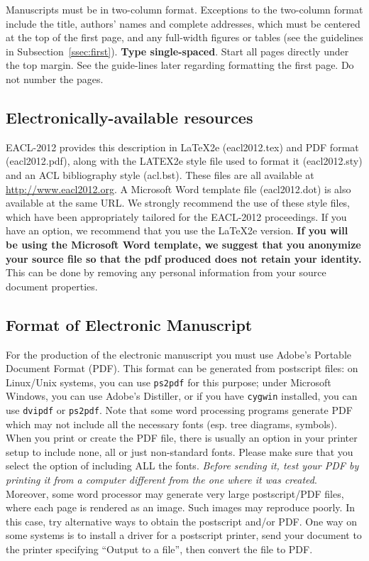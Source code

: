 \documentclass[11pt]{article}
\begin{document}
Manuscripts must be in two-column format. Exceptions to the two-column format include the title, 
authors' names and complete addresses, which must be centered at the top of the first page, 
and any full-width figures or tables (see the guidelines in Subsection~\ref{ssec:first}). {\bf Type single-spaced}. 
Start all pages directly under the top margin. See the guide-lines later regarding formatting the first page. Do not number the pages.

\subsection{Electronically-available resources}

EACL-2012 provides this description in \LaTeX2e (eacl2012.tex) and PDF format (eacl2012.pdf), along with the LATEX2e style file used to format it (eacl2012.sty) and an ACL bibliography style (acl.bst). These files are all available at \url{http://www.eacl2012.org}.  A Microsoft Word template file (eacl2012.dot) is also available at the same URL. We strongly recommend the use of these style files, which have been appropriately tailored for the EACL-2012 proceedings. If you have an option, we recommend that you use the \LaTeX2e version. \textbf{If you will be using the Microsoft Word template, we suggest that you anonymize your source file so that the pdf produced does not retain your identity.} This can be done by removing any personal information from your source
document properties.


\subsection{Format of Electronic Manuscript}
\label{sect:pdf}

For the production of the electronic manuscript you must use Adobe's
Portable Document Format (PDF). This format can be generated from
postscript files: on Linux/Unix systems, you can use {\tt ps2pdf} for this
purpose; under Microsoft Windows, you can use Adobe's Distiller, or
if you have {\tt cygwin} installed, you can use {\tt dvipdf} or
{\tt ps2pdf}.  Note
that some word processing programs generate PDF which may not include
all the necessary fonts (esp. tree diagrams, symbols). When you print
or create the PDF file, there is usually an option in your printer
setup to include none, all or just non-standard fonts.  Please make
sure that you select the option of including ALL the fonts.  {\em Before sending it, test your PDF by printing it from a computer different from the one where it was created}. Moreover,
some word processor may generate very large postscript/PDF files,
where each page is rendered as an image. Such images may reproduce
poorly.  In this case, try alternative ways to obtain the postscript
and/or PDF.  One way on some systems is to install a driver for a
postscript printer, send your document to the printer specifying
``Output to a file'', then convert the file to PDF.
\end{document}
